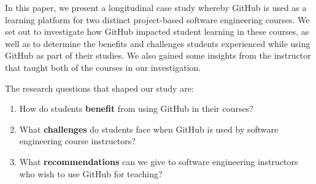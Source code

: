 


In this paper, we present a longitudinal case study whereby GitHub is used as a learning platform for two distinct project-based software engineering courses. We set out to investigate how GitHub impacted student learning in these courses, as well as to determine the benefits and challenges students experienced while using GitHub as part of their studies. We also gained some insights from the instructor that taught both of the courses in our investigation.

The research questions that shaped our study are:
\begin{enumerate}[RQ1]
\item How do students \textbf{benefit} from using GitHub in their courses?
\item What \textbf{challenges} do students face when GitHub is used by software engineering course instructors?
\item What \textbf{recommendations} can we give to software engineering instructors who wish to use GitHub for teaching?
\end{enumerate}

